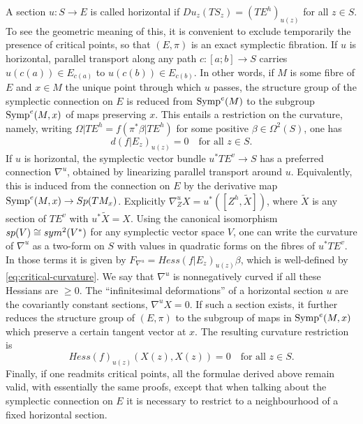 \documentclass[10pt,letterpaper]{article}
\begin{document}
A section $u: S \rightarrow E$ is called horizontal if $Du_z(TS_z) =
(TE^h)_{u(z)}$ for all $z \in S$. To see the geometric meaning of this, it is
convenient to exclude temporarily the presence of critical points, so that
$(E,\pi)$ is an exact symplectic fibration.  If $u$ is horizontal, parallel
transport along any path $c: [a;b] \rightarrow S$ carries $u(c(a)) \in
E_{c(a)}$ to $u(c(b)) \in E_{c(b)}$. In other words, if $M$ is some fibre of
$E$ and $x \in M$ the unique point through which $u$ passes, the structure
group of the symplectic connection on $E$ is reduced from $\mathrm{Symp}^e(M)$ to the
subgroup $\mathrm{Symp}^e(M,x)$ of maps preserving $x$. This entails a restriction on
the curvature, namely, writing $\Omega|TE^h = f(\pi^*\beta|TE^h)$ for some
positive $\beta \in \Omega^2(S)$, one has
\begin{equation} \label{eq:critical-curvature}
d(f|E_z)_{u(z)} = 0 \quad \text{for all $z \in S$}.
\end{equation}
If $u$ is horizontal, the symplectic vector bundle $u^*TE^v \rightarrow S$ has
a preferred connection $\nabla^u$, obtained by linearizing parallel transport
around $u$. Equivalently, this is induced from the connection on $E$ by the
derivative map $\mathrm{Symp}^e(M,x) \rightarrow Sp(TM_x)$. Explicitly $\nabla^u_ZX =
u^*([Z^h,\tilde{X}])$, where $\tilde{X}$ is any section of $TE^v$ with
$u^*\tilde{X} = X$. Using the canonical isomorphism $sp(V) \cong sym^2(V^*)$ for
any symplectic vector space $V$, one can write the curvature of $\nabla^u$ as a
two-form on $S$ with values in quadratic forms on the fibres of $u^*TE^v$. In
those terms it is given by $F_{\nabla^u} = Hess(f|E_z)_{u(z)} \beta$, which is
well-defined by \eqref{eq:critical-curvature}. We say that $\nabla^u$ is
nonnegatively curved if all these Hessians are $\geq 0$. The ``infinitesimal
deformations'' of a horizontal section $u$ are the covariantly constant
sections, $\nabla^u X = 0$. If such a section exists, it further reduces the
structure group of $(E,\pi)$ to the subgroup of maps in $\mathrm{Symp}^e(M,x)$ which
preserve a certain tangent vector at $x$. The resulting curvature restriction
is
\begin{equation} \label{eq:hessians}
Hess(f)_{u(z)}(X(z),X(z)) = 0 \quad \text{for all $z \in S$.}
\end{equation}
Finally, if one readmits critical points, all the formulae derived above remain
valid, with essentially the same proofs, except that when talking about the
symplectic connection on $E$ it is necessary to restrict to a neighbourhood of
a fixed horizontal section.
\end{document}
